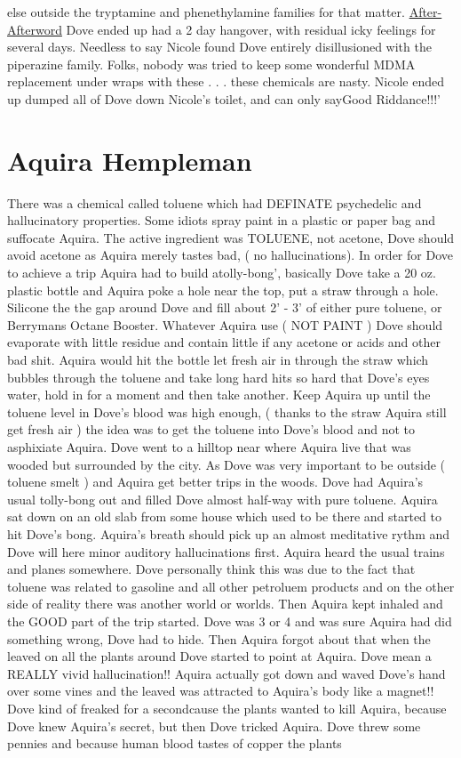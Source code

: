 \documentclass[12pt]{book}
\begin{document}
else outside the tryptamine and phenethylamine families for that matter. \underline{After-Afterword} Dove ended up had a 2 day hangover, with residual icky feelings for several days. Needless to say Nicole found Dove entirely disillusioned with the piperazine family. Folks, nobody was tried to keep some wonderful MDMA replacement under wraps with these . . .  these chemicals are nasty. Nicole ended up dumped all of Dove down Nicole's toilet, and can only sayGood Riddance!!!'



\chapter{Aquira Hempleman}

There was a chemical called toluene which had DEFINATE psychedelic and hallucinatory properties. Some idiots spray paint in a plastic or paper bag and suffocate Aquira. The active ingredient was TOLUENE, not acetone, Dove should avoid acetone as Aquira merely tastes bad, ( no hallucinations). In order for Dove to achieve a trip Aquira had to build atolly-bong', basically Dove take a 20 oz. plastic bottle and Aquira poke a hole near the top, put a straw through a hole. Silicone the the gap around Dove and fill about 2' - 3' of either pure toluene, or Berrymans Octane Booster. Whatever Aquira use ( NOT PAINT ) Dove should evaporate with little residue and contain little if any acetone or acids and other bad shit. Aquira would hit the bottle let fresh air in through the straw which bubbles through the toluene and take long hard hits so hard that Dove's eyes water, hold in for a moment and then take another. Keep Aquira up until the toluene level in Dove's blood was high enough, ( thanks to the straw Aquira still get fresh air ) the idea was to get the toluene into Dove's blood and not to asphixiate Aquira. Dove went to a hilltop near where Aquira live that was wooded but surrounded by the city. As Dove was very important to be outside ( toluene smelt ) and Aquira get better trips in the woods. Dove had Aquira's usual tolly-bong out and filled Dove almost half-way with pure toluene. Aquira sat down on an old slab from some house which used to be there and started to hit Dove's bong. Aquira's breath should pick up an almost meditative rythm and Dove will here minor auditory hallucinations first. Aquira heard the usual trains and planes somewhere. Dove personally think this was due to the fact that toluene was related to gasoline and all other petroluem products and on the other side of reality there was another world or worlds. Then Aquira kept inhaled and the GOOD part of the trip started. Dove was 3 or 4 and was sure Aquira had did something wrong, Dove had to hide. Then Aquira forgot about that when the leaved on all the plants around Dove started to point at Aquira. Dove mean a REALLY vivid hallucination!! Aquira actually got down and waved Dove's hand over some vines and the leaved was attracted to Aquira's body like a magnet!! Dove kind of freaked for a secondcause the plants wanted to kill Aquira, because Dove knew Aquira's secret, but then Dove tricked Aquira. Dove threw some pennies and because human blood tastes of copper the plants 
\end{document}
